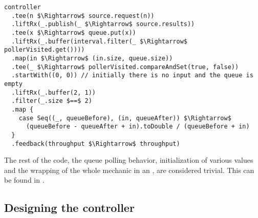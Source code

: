 \begin{minipage}{\linewidth}
\begin{lstlisting}[style=ScalaStyle, caption={Feedback system for controlling the buffer}, label={lst:buffer-feedback-control}]
controller
  .tee(n $\Rightarrow$ source.request(n))
  .liftRx(_.publish(_ $\Rightarrow$ source.results))
  .tee(x $\Rightarrow$ queue.put(x))
  .liftRx(_.buffer(interval.filter(_ $\Rightarrow$ pollerVisited.get())))
  .map(in $\Rightarrow$ (in.size, queue.size))
  .tee(_ $\Rightarrow$ pollerVisited.compareAndSet(true, false))
  .startWith((0, 0)) // initially there is no input and the queue is empty
  .liftRx(_.buffer(2, 1))
  .filter(_.size $==$ 2)
  .map {
    case Seq((_, queueBefore), (in, queueAfter)) $\Rightarrow$
      (queueBefore - queueAfter + in).toDouble / (queueBefore + in)
  }
  .feedback(throughput $\Rightarrow$ throughput)
\end{lstlisting}
\end{minipage}

The rest of the code, the queue polling behavior, initialization of various values and the wrapping of the whole mechanic in an , are considered trivial. This can be found in .

\subsection{Designing the controller}
\label{subsec:controller-design}










































